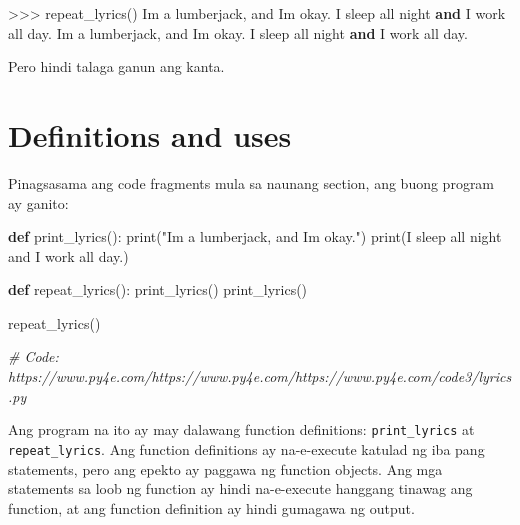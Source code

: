 \documentclass[10pt,]{book}
\newenvironment{Shaded}{}{}
\newcommand{\BuiltInTok}[1]{\textcolor[rgb]{0.00,0.50,0.00}{#1}}
\newcommand{\CommentTok}[1]{\textcolor[rgb]{0.38,0.63,0.69}{\textit{#1}}}
\newcommand{\KeywordTok}[1]{\textcolor[rgb]{0.00,0.44,0.13}{\textbf{#1}}}
\newcommand{\NormalTok}[1]{#1}
\newcommand{\OperatorTok}[1]{\textcolor[rgb]{0.40,0.40,0.40}{#1}}
\newcommand{\StringTok}[1]{\textcolor[rgb]{0.25,0.44,0.63}{#1}}
\begin{document}
\begin{Shaded}
\begin{Highlighting}[]
\OperatorTok{\textgreater{}\textgreater{}\textgreater{}}\NormalTok{ repeat\_lyrics()}
\NormalTok{I}\StringTok{\textquotesingle{}m a lumberjack, and I\textquotesingle{}}\NormalTok{m okay.}
\NormalTok{I sleep }\BuiltInTok{all}\NormalTok{ night }\KeywordTok{and}\NormalTok{ I work }\BuiltInTok{all}\NormalTok{ day.}
\NormalTok{I}\StringTok{\textquotesingle{}m a lumberjack, and I\textquotesingle{}}\NormalTok{m okay.}
\NormalTok{I sleep }\BuiltInTok{all}\NormalTok{ night }\KeywordTok{and}\NormalTok{ I work }\BuiltInTok{all}\NormalTok{ day.}
\end{Highlighting}
\end{Shaded}

Pero hindi talaga ganun ang kanta.

\section{Definitions and uses}\label{definitions-and-uses}


Pinagsasama ang code fragments mula sa naunang section, ang buong
program ay ganito:

\begin{Shaded}
\begin{Highlighting}[]
\KeywordTok{def}\NormalTok{ print\_lyrics():}
    \BuiltInTok{print}\NormalTok{(}\StringTok{"I\textquotesingle{}m a lumberjack, and I\textquotesingle{}m okay."}\NormalTok{)}
    \BuiltInTok{print}\NormalTok{(}\StringTok{\textquotesingle{}I sleep all night and I work all day.\textquotesingle{}}\NormalTok{)}


\KeywordTok{def}\NormalTok{ repeat\_lyrics():}
\NormalTok{    print\_lyrics()}
\NormalTok{    print\_lyrics()}

\NormalTok{repeat\_lyrics()}

\CommentTok{\# Code: https://www.py4e.com/https://www.py4e.com/https://www.py4e.com/code3/lyrics.py}
\end{Highlighting}
\end{Shaded}

Ang program na ito ay may dalawang function definitions:
\texttt{print\_lyrics} at \texttt{repeat\_lyrics}. Ang function
definitions ay na-e-execute katulad ng iba pang statements, pero ang
epekto ay paggawa ng function objects. Ang mga statements sa loob ng
function ay hindi na-e-execute hanggang tinawag ang function, at ang
function definition ay hindi gumagawa ng output.
\end{document}
